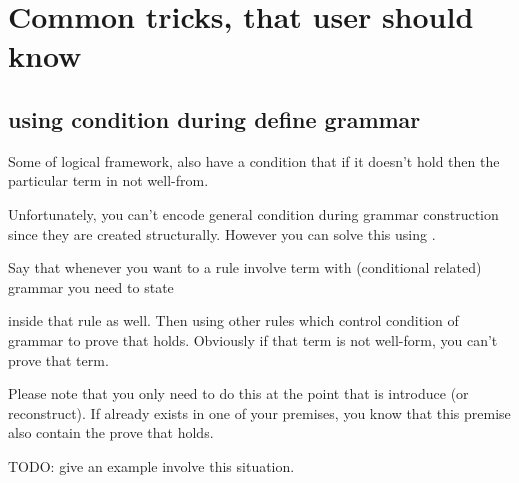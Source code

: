 

\chapter{Common tricks, that user should know}

\section{using condition during define grammar}

Some of logical framework, also have a condition that if it doesn't hold then the particular term in not well-from.

Unfortunately, you can't encode general condition during grammar construction since they are created structurally. However you can solve this using \kRule.

Say that whenever you want to a rule involve term  with (conditional related) grammar  you need to state

\kPremise {} 

inside that rule as well. Then using other rules which control condition of grammar  to prove that  holds. Obviously if that term is not well-form, you can't prove that term.

Please note that you only need to do this at the point that  is introduce (or reconstruct). If  already exists in one of your premises, you know that this premise also contain the prove that  holds.

TODO: give an example involve this situation.
